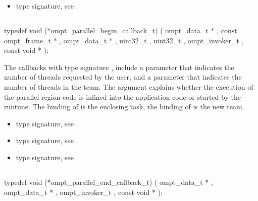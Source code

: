 \crossreferences
\begin{itemize}
\item {} type signature, see
.
\end{itemize}



\subsection{}
\label{subsec:ompt_parallel_begin_callback_t}
\format
\begin{boxedcode}
typedef void (*ompt\_parallel\_begin\_callback\_t) (
               ompt\_data\_t * ,
               const ompt\_frame\_t * ,
               ompt\_data\_t * ,
               uint32\_t ,
               uint32\_t ,
               ompt\_invoker\_t ,
               const void * 
);
\end{boxedcode}

\descr
The callbacks with type signature ,
include a parameter 
that indicates the number of threads requested by the user, and a parameter
 that indicates the number of threads in the team.
The  argument explains whether the execution of the parallel
region code is inlined into the application code or started by the runtime.
The binding of  is the enclosing task, the binding of
 is the new team.


\crossreferences
\begin{itemize}
\item {} type signature, see
.
\item {} type signature, see
.
\item {} type signature, see
.
\end{itemize}



\subsection{}
\label{subsec:ompt_parallel_end_callback_t}
\format
\begin{boxedcode}
typedef void (*ompt\_parallel\_end\_callback\_t) (
               ompt\_data\_t * ,
               ompt\_data\_t * ,
               ompt\_invoker\_t ,
               const void * 
);
\end{boxedcode}

